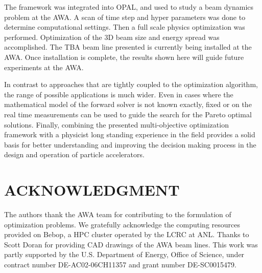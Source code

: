 \documentclass[%
preprint,
preprint,
linenumbers,
amsmath,amssymb,
aps,
prstab,
]{revtex4-1}
\begin{document}
%
%  
%
The framework was integrated into OPAL, and used 
to study a beam dynamics problem at the AWA.
A scan of time step and hyper parameters was done to determine computational settings.
Then a full scale physics optimization was performed.
Optimization of the 3D beam size and energy spread was accomplished.
The TBA beam line presented is currently being installed at the AWA.
Once installation is complete, 
the results shown here will guide future experiments at the AWA.

In contrast to approaches that are tightly coupled to the optimization
  algorithm, the range of possible applications is much wider.
Even in cases where the mathematical model of the forward solver is not known
  exactly, fixed or on the real time measurements can be used to guide the
  search for the Pareto optimal solutions.
Finally, combining the presented multi-objective optimization framework with
  a physicist long standing experience in the field provides a solid basis
  for better understanding and improving the decision making process in the
  design and operation of particle accelerators.

 


\section{ACKNOWLEDGMENT}

The authors thank the AWA team for contributing to the
  formulation of optimization problems. 
  We gratefully acknowledge the computing resources provided on Bebop,
  a HPC cluster operated by the LCRC at ANL.
  Thanks to Scott Doran for providing CAD drawings of the AWA beam lines.
  This work was partly supported by the 
  U.S. Department of Energy, Office of Science, under 
  contract number DE-AC02-06CH11357 and grant number DE-SC0015479. 
\end{document}
